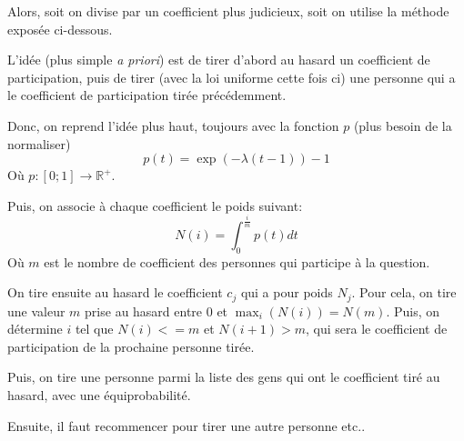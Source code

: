 \documentclass[11pt, a4paper]{article}
\begin{document}
Alors, soit on divise par un coefficient plus judicieux, soit on utilise la méthode exposée ci-dessous.

L'idée (plus simple \emph{a priori}) est de tirer d'abord au hasard un coefficient de participation, puis de
tirer (avec la loi uniforme cette fois ci) une personne qui a le coefficient de participation tirée
précédemment.

Donc, on reprend l'idée plus haut, toujours avec la fonction $p$ (plus besoin de la normaliser)
\[
    p(t) = \exp(-\lambda(t-1))-1
\]
Où $p: [0;1] \to \mathbb{R}^+$.

Puis, on associe à chaque coefficient le poids suivant:
\[
    N(i)=\int_{0}^{\frac{i}{m}}p(t)dt
\]
Où $m$ est le nombre de coefficient des personnes qui participe à la question.

On tire ensuite au hasard le coefficient $c_j$ qui a pour poids $N_j$. Pour cela, on tire une valeur
$m$ prise au hasard entre $0$ et $\max_{i}(N(i)) = N(m)$. Puis, on détermine $i$ tel que $N(i) <= m$
et $N(i+1)>m$, qui sera le coefficient de participation de la prochaine personne tirée.

Puis, on tire une personne parmi la liste des gens qui ont le coefficient tiré au hasard, avec une
équiprobabilité.

Ensuite, il faut recommencer pour tirer une autre personne etc..
\end{document}
